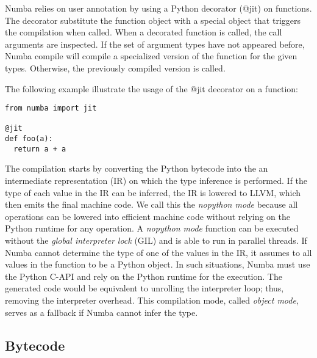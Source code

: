 \documentclass{sig-alternate}
\begin{document}
Numba relies on user annotation by using a Python decorator (@jit) on functions.
The decorator substitute the function object with a special object that triggers
the compilation when called. When a decorated function is called,
the call arguments are inspected. If the set of argument types have not appeared
before, Numba compile will compile a specialized version of the function for the
given types. Otherwise, the previously compiled version is called.

The following example illustrate the usage of the @jit decorator on a function:


\begin{lstlisting}
from numba import jit

@jit
def foo(a):
  return a + a
\end{lstlisting}

The compilation starts by converting the Python bytecode into the an
intermediate representation (IR) on which the type inference is
performed. If the type of each value in the IR can be inferred, the IR
is lowered to LLVM, which then emits the final machine code.  We call
this the \textit{nopython mode} because all operations can be lowered
into efficient machine code without relying on the Python runtime for
any operation.  A \textit{nopython mode} function can be executed
without the \textit{global interpreter lock} (GIL) and is able to run
in parallel threads.  If Numba cannot determine the type of one of the
values in the IR, it assumes to all values in the function to be a
Python object. In such situations, Numba must use the Python C-API and
rely on the Python runtime for the execution. The generated code would
be equivalent to unrolling the interpreter loop; thus, removing the
interpreter overhead.  This compilation mode, called \textit{object
  mode}, serves as a fallback if Numba cannot infer the type.

\subsection{Bytecode}
\end{document}
